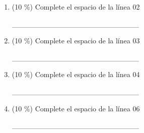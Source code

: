 \documentclass[twocolumn]{article}
\begin{document}
\begin{enumerate}[label=\Alph*]
	\item (10 \%) Complete el espacio de la línea 02

	\_\_\_\_\_\_\_\_\_\_\_\_\_\_\_\_\_\_\_\_\_\_\_\_

	\item (10 \%) Complete el espacio de la línea 03

	\_\_\_\_\_\_\_\_\_\_\_\_\_\_\_\_\_\_\_\_\_\_\_\_

	\item (10 \%) Complete el espacio de la línea 04

	\_\_\_\_\_\_\_\_\_\_\_\_\_\_\_\_\_\_\_\_\_\_\_\_

	\item (10 \%) Complete el espacio de la línea 06	

	\_\_\_\_\_\_\_\_\_\_\_\_\_\_\_\_\_\_\_\_\_\_\_\_
\end{enumerate} 



              
\end{document}

